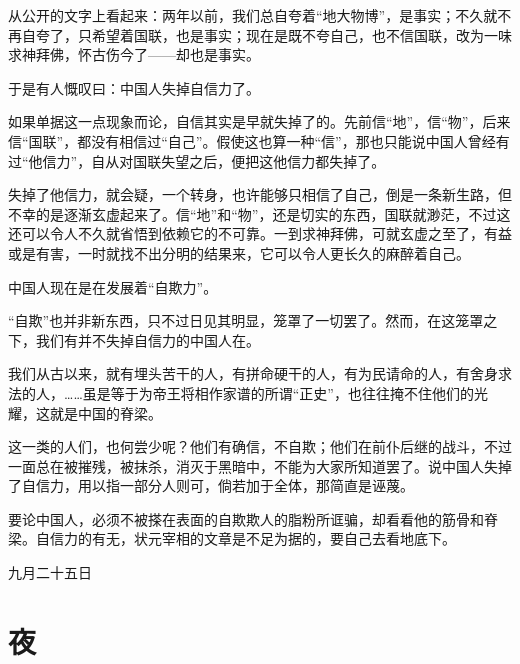 \documentclass[12pt,UTF-8,openany]{ctexbook}
\begin{document}
\begin{normalsize}
    
    从公开的文字上看起来：两年以前，我们总自夸着“地大物博”，是事实；不久就不再自夸了，只希望着国联，也是事实；现在是既不夸自己，也不信国联，改为一味求神拜佛，怀古伤今了——却也是事实。
    
    于是有人慨叹曰：中国人失掉自信力了。
    
    如果单据这一点现象而论，自信其实是早就失掉了的。先前信“地”，信“物”，后来信“国联”，都没有相信过“自己”。假使这也算一种“信”，那也只能说中国人曾经有过“他信力”，自从对国联失望之后，便把这他信力都失掉了。
    
    失掉了他信力，就会疑，一个转身，也许能够只相信了自己，倒是一条新生路，但不幸的是逐渐玄虚起来了。信“地”和“物”，还是切实的东西，国联就渺茫，不过这还可以令人不久就省悟到依赖它的不可靠。一到求神拜佛，可就玄虚之至了，有益或是有害，一时就找不出分明的结果来，它可以令人更长久的麻醉着自己。
    
    中国人现在是在发展着“自欺力”。
    
    “自欺”也并非新东西，只不过日见其明显，笼罩了一切罢了。然而，在这笼罩之下，我们有并不失掉自信力的中国人在。
    
    我们从古以来，就有埋头苦干的人，有拼命硬干的人，有为民请命的人，有舍身求法的人，……虽是等于为帝王将相作家谱的所谓“正史”，也往往掩不住他们的光耀，这就是中国的脊梁。
    
    这一类的人们，也何尝少呢？他们有确信，不自欺；他们在前仆后继的战斗，不过一面总在被摧残，被抹杀，消灭于黑暗中，不能为大家所知道罢了。说中国人失掉了自信力，用以指一部分人则可，倘若加于全体，那简直是诬蔑。
    
    要论中国人，必须不被搽在表面的自欺欺人的脂粉所诓骗，却看看他的筋骨和脊梁。自信力的有无，状元宰相的文章是不足为据的，要自己去看地底下。
    
    \hfill 九月二十五日
    
\end{normalsize}



\chapter{夜}
\end{document}
